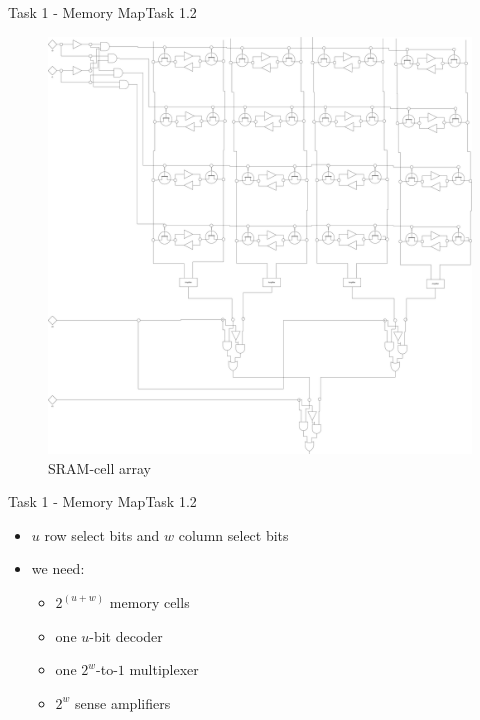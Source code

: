 \begin{frame}{Task 1 - Memory Map}{Task 1.2\vspace{0.25cm}}
  \begin{figure}
    \centering
    \includegraphics[height=0.6\paperheight]{./figures/sram.png}
    \caption{SRAM-cell array}
  \end{figure}
\end{frame}

\begin{frame}{Task 1 - Memory Map}{Task 1.2\vspace{0.25cm}}
  \begin{itemize}
    \item $u$ \alert{row} select bits and $w$ \alert{column} select bits
    \item \alert{we need:}
    \begin{itemize}
      \item $2^{(u+w)}$ memory cells
      \item one $u$-bit decoder
      \item one $2^w$-to-$1$ multiplexer
      \item $2^w$ sense amplifiers
    \end{itemize}
  \end{itemize}
\end{frame}


